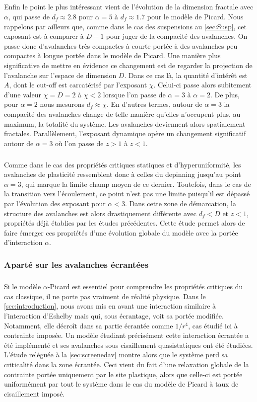 \subparagraph{}Enfin le point le plus intéressant vient de l'évolution de la dimension fractale avec $\alpha$, qui passe de $d_f\approx 2.8$ pour $\alpha=5$ à $d_f\approx 1.7$ pour le modèle de Picard. Nous rappelons par ailleurs que, comme dans le cas des suspensions au \autoref{sec:Susp}, cet exposant est à comparer à $D+1$ pour juger de la compacité des avalanches. On passe donc d'avalanches très compactes à courte portée à des avalanches peu compactes à longue portée dans le modèle de Picard. Une manière plus significative de mettre en évidence ce changement est de regarder la projection de l'avalanche sur l'espace de dimension $D$. Dans ce cas là, la quantité d'intérêt est $A$, dont le cut-off est carcatérisé par l'exposant $\chi$. Celui-ci passe alors subitement d'une valeur $\chi=D=2$ à $\chi<2$ lorsque l'on passe de $\alpha=3$ à $\alpha=2$. De plus, pour $\alpha=2$ nous mesurons $d_f\approx\chi$. En d'autres termes, autour de $\alpha=3$ la compacité des avalanches change de telle manière qu'elles n'occupent plus, au maximum, la totalité du système. Les avalanches deviennent alors spatialement fractales. Parallèlement, l'exposant dynamique opère un changement significatif autour de $\alpha=3$ où l'on passe de $z>1$ à $z<1$.

\subparagraph{}Comme dans le cas des propriétés critiques statiques et d'hyperuniformité, les avalanches de plasticité ressemblent donc à celles du depinning jusqu'au point $\alpha = 3$, qui marque la limite champ moyen de ce dernier. Toutefois, dans le cas de la transition vers l'écoulement, ce point n'est pas une limite puisqu'il est dépassé par l'évolution des exposant pour $\alpha<3$. Dans cette zone de démarcation, la structure des avalanches est alors drastiquement différente avec $d_f<D$ et $z<1$, propriétés déjà établies par les études précédentes. Cette étude permet alors de faire émerger ces propriétés d'une évolution globale du modèle avec la portée d'interaction $\alpha$.

\subsubsection{Aparté sur les avalanches écrantées}

\subparagraph{}Si le modèle $\alpha$-Picard est essentiel pour comprendre les propriétés critiques du cas classique, il ne porte pas vraiment de réalité physique. Dans le \autoref{sec:introduction}, nous avons mis en avant une interaction similaire à l'interaction d'Eshelby mais qui, sous écrantage, voit sa portée modifiée. Notamment, elle décroît dans sa partie écrantée comme $1/r^4$, cas étudié ici à contrainte imposée. Un modèle étudiant précisément cette interaction écrantée a été implémenté et ses avalanches sous cisaillement quasistatiques ont été étudiées. L'étude reléguée à la \autoref{sec:screenedav} montre alors que le système perd sa criticalité dans la zone écrantée. Ceci vient du fait d'une relaxation globale de la contrainte portée uniquement par le site plastique, alors que celle-ci est portée uniformément par tout le système dans le cas du modèle de Picard à taux de cisaillement imposé.

